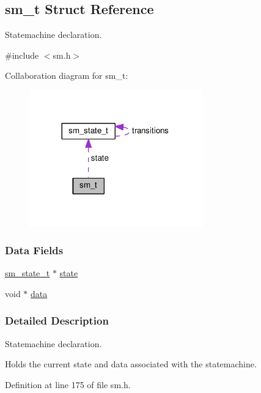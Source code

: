 \hypertarget{structsm__t}{}\subsection{sm\+\_\+t Struct Reference}
\label{structsm__t}


Statemachine declaration.  




{\ttfamily \#include $<$sm.\+h$>$}



Collaboration diagram for sm\+\_\+t\+:\nopagebreak
\begin{figure}[H]
\begin{center}
\leavevmode
\includegraphics[width=212pt]{structsm__t__coll__graph}
\end{center}
\end{figure}
\subsubsection*{Data Fields}
\begin{DoxyCompactItemize}
\item 
\hyperlink{structsm__state__t}{sm\+\_\+state\+\_\+t} $\ast$ \hyperlink{structsm__t_ab950ad4739c4f74fc7070daba557c707}{state}
\item 
void $\ast$ \hyperlink{structsm__t_a735984d41155bc1032e09bece8f8d66d}{data}
\end{DoxyCompactItemize}


\subsubsection{Detailed Description}
Statemachine declaration. 

Holds the current state and data associated with the statemachine. 

Definition at line 175 of file sm.\+h.



